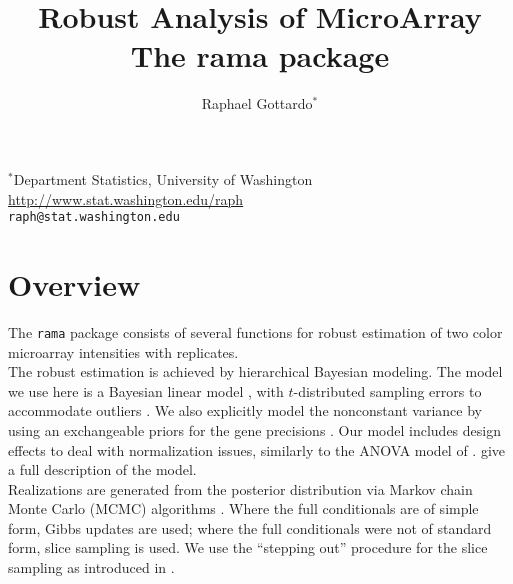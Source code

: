 \documentclass[11pt]{article}
\begin{document}
\title{\bf Robust Analysis of MicroArray\\
The rama package}
\author{Raphael Gottardo$^*$}

\maketitle

\begin{center}
  $^*$Department Statistics, University of Washington\\
  \url{http://www.stat.washington.edu/raph}\\
  {\tt raph@stat.washington.edu}
\end{center}

\tableofcontents


\section{Overview}

The {\tt rama} package consists of several functions for
robust estimation of two color microarray intensities with replicates.\\  

The robust estimation is achieved by hierarchical Bayesian modeling.
The model we use here is a Bayesian linear model \cite{bib:lindley72}, 
with $t$-distributed sampling errors to accommodate outliers \cite{bib:besag_higdon99}.
We also explicitly model the nonconstant variance by using an exchangeable priors for the gene precisions .
Our model includes design effects to deal with normalization issues, similarly to the ANOVA model of . 
 give a full description of the model. \\

Realizations are generated from the posterior distribution
via Markov chain Monte Carlo (MCMC) algorithms \cite{bib:gelfand90,bib:brooks98}.  
Where the full conditionals are of simple form, Gibbs updates are used; where the full conditionals were not of standard
form, slice sampling is used. We use the ``stepping out'' procedure for the slice sampling as introduced in . \\
\end{document}
